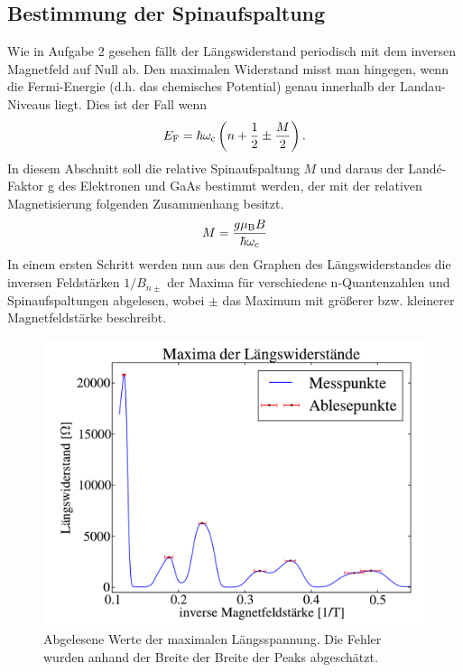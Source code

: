 \documentclass[paper=a4,fontsize=10pt,DIV=18,twocolumn,parskip=half]{scrartcl}
\numberwithin{equation}{section}    %
\begin{document}
\subsection{Bestimmung der Spinaufspaltung}
\label{a6}
Wie in Aufgabe 2 gesehen fällt der Längswiderstand periodisch mit dem inversen Magnetfeld auf Null ab. Den maximalen Widerstand misst man hingegen, wenn die Fermi-Energie (d.h. das chemisches Potential) genau innerhalb der Landau-Niveaus liegt. Dies ist der Fall wenn
\begin{equation}
E_{\rm F}=\hbar \omega_{\rm c}\left( n+\frac{1}{2}\pm\frac{M}{2}\right).
\end{equation}
In diesem Abschnitt soll die relative Spinaufspaltung $M$ und daraus der Landé-Faktor g des Elektronen und GaAs bestimmt werden, der mit der relativen Magnetisierung folgenden Zusammenhang besitzt.
\begin{equation}
M=\frac{g \mu_{\rm B} B}{\hbar \omega_{\rm c}}
\label{lande}
\end{equation}
In einem ersten Schritt werden nun aus den Graphen des Längswiderstandes die inversen Feldstärken $1/B_{n\pm}$ der Maxima für verschiedene n-Quantenzahlen und Spinaufspaltungen abgelesen, wobei $\pm$ das Maximum mit größerer bzw. kleinerer Magnetfeldstärke beschreibt.

\begin{figure}[]
	\begin{center}
		\includegraphics[width=\columnwidth]{Data-Plots/07-maxima_ablesen.pdf}
		\caption{Abgelesene Werte der maximalen Längsspannung. Die Fehler wurden anhand der Breite der Breite der Peaks abgeschätzt.}
		\label{maxima}
	\end{center}
\end{figure}
\end{document}
